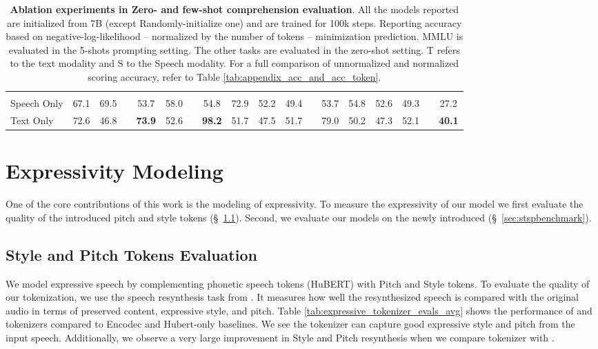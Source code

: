 \begin{table*}[t]
{\begin{tabu}{l cc c  cc c cccc c cccc c c }
\hdashline

\\
Speech Only                            &   67.1 &   69.5 &&   53.7 &   58.0 &&   54.8 &   72.9 &   52.2 &   49.4 &&   53.7 &   54.8 &   52.6 &   49.3 &&   27.2 \\
Text Only                              &   72.6 &   46.8 &&\bf73.9 &   52.6 &&   \bf 98.2 &   51.7 &   47.5 &   51.7 &&   79.0 &   50.2 &   47.3 &   52.1 &&\bf 40.1 \\

\bottomrule
\end{tabu}
}%
\caption{
\textbf{Ablation experiments in Zero- and few-shot comprehension evaluation}. All the models reported are initialized from \llamatwo 7B (except Randomly-initialize one) and are trained for 100k steps. Reporting accuracy based on negative-log-likelihood -- normalized by the number of tokens --  minimization prediction. MMLU is evaluated in the 5-shots prompting setting. The other tasks are evaluated in the zero-shot setting. T refers to the text modality and S to the Speech modality. For a full comparison of unnormalized and normalized scoring accuracy, refer to Table \ref{tab:appendix_acc_and_acc_token}.
}
\label{tab:ablation_zero_shot_and_mmlu}
\vspace{-1.2em}
\end{table*}

\section{Expressivity Modeling} \label{sec:sentimentmodeling}
One of the core contributions of this work is the modeling of expressivity. To measure the expressivity of our model we first evaluate the quality of the introduced pitch and style tokens (\S~\ref{sec:expressivity_token_eval}). Second, we evaluate our \spot models on the newly introduced \sentimentbenchmark (\S~\ref{sec:stspbenchmark}). 

\subsection{Style and Pitch Tokens Evaluation}
\label{sec:expressivity_token_eval}

We model expressive speech by complementing phonetic speech tokens (HuBERT) with Pitch and Style tokens. 
To evaluate the quality of our tokenization, we use the speech resynthesis task from \citet{nguyen2023expresso}.
It measures how well the resynthesized speech is compared with the original audio in terms of preserved content, expressive style, and pitch. Table \ref{tab:expressive_tokenizer_evals_avg} shows the performance of \spotbase and \spotexpressive tokenizers compared to Encodec and Hubert-only baselines.  We see the \spotexpressive tokenizer can capture good expressive style and pitch from the input speech. Additionally, we observe a very large improvement in Style and Pitch resynthesis when we compare \spotbase tokenizer with \spotexpressive. 

